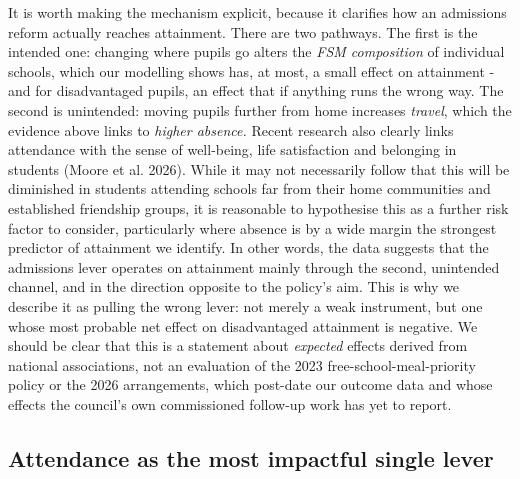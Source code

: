 \documentclass[
  12pt,
  titlepage]{article}
\begin{document}
It is worth making the mechanism explicit, because it clarifies how an
admissions reform actually reaches attainment. There are two pathways.
The first is the intended one: changing where pupils go alters the
\emph{FSM composition} of individual schools, which our modelling shows
has, at most, a small effect on attainment - and for disadvantaged
pupils, an effect that if anything runs the wrong way. The second is
unintended: moving pupils further from home increases \emph{travel},
which the evidence above links to \emph{higher absence.} Recent research
also clearly links attendance with the sense of well-being, life
satisfaction and belonging in students (Moore et al. 2026). While it may
not necessarily follow that this will be diminished in students
attending schools far from their home communities and established
friendship groups, it is reasonable to hypothesise this as a further
risk factor to consider, particularly where absence is by a wide margin
the strongest predictor of attainment we identify. In other words, the
data suggests that the admissions lever operates on attainment mainly
through the second, unintended channel, and in the direction opposite to
the policy's aim. This is why we describe it as pulling the wrong lever:
not merely a weak instrument, but one whose most probable net effect on
disadvantaged attainment is negative. We should be clear that this is a
statement about \emph{expected} effects derived from national
associations, not an evaluation of the 2023 free-school-meal-priority
policy or the 2026 arrangements, which post-date our outcome data and
whose effects the council's own commissioned follow-up work has yet to
report.

\subsection{Attendance as the most impactful single
lever}\label{attendance-as-the-most-impactful-single-lever}
\end{document}
